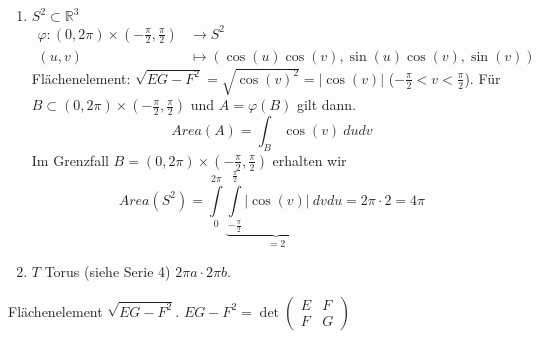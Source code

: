 \documentclass[../main.tex]{subfiles}
\begin{document}
\begin{examples}
    \leavevmode
    \begin{enumerate}
        \item $S^2 \subset \mathbb{R}^3$
        \begin{align*}
            \varphi : (0, 2\pi) \times (-\frac{\pi}{2}, \frac{\pi}{2}) &\to S^2 \\
            (u,v) &\mapsto (\cos(u)\cos(v), \sin(u)\cos(v), \sin(v))
        \end{align*}
        Flächenelement: $\sqrt{EG-F^2}= \sqrt{\cos(v)^2}=|\cos(v)|$ ($-\frac{\pi}{2}<v<\frac{\pi}{2}$).
        Für $B \subset (0, 2\pi) \times (-\frac{\pi}{2}, \frac{\pi}{2})$ und $A=\varphi(B)$ gilt dann.
        $$Area(A)=\int _B \cos(v) \ dudv$$
        Im Grenzfall $B= (0,2\pi) \times (-\frac{\pi}{2},\frac{\pi}{2})$ erhalten wir
        $$Area(S^2)=\int \limits _0 ^{2\pi} \underbrace{\int \limits _{-\frac{\pi}{2}}^{\frac{\pi}{2}} |\cos(v)| \ dv}_{=2}du = 2\pi \cdot 2 = 4\pi$$
    
        \item $T$ Torus (siehe Serie 4) $2\pi a \cdot 2\pi b$.
    \end{enumerate}
\end{examples}

\begin{zusatz}
    Flächenelement $\sqrt{EG-F^2}$. $EG-F^2 = \det \begin{pmatrix}
        E & F \\ F & G
    \end{pmatrix}$
\end{zusatz}
\end{document}
